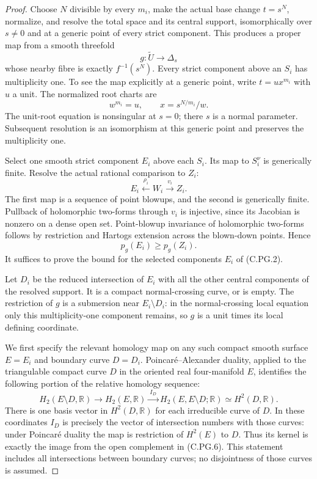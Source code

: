 \begin{proof}
Choose $N$ divisible by every $m_i$, make the actual
base change $t=s^N$, normalize, and resolve the total
space and its central support, isomorphically over
$s\ne0$ and at a generic point of every strict
component. This produces a proper map from a smooth
threefold
\[
                         g:\widetilde U\to\Delta_s
                                                               \tag{C.PG.2}
\]
whose nearby fibre is exactly $f^{-1}(s^N)$.
Every strict component above an $S_i$ has multiplicity
one. To see the map explicitly at a generic point,
write $t=u x^{m_i}$ with $u$ a unit. The normalized
root charts are
\[
       w^{m_i}=u,\qquad x=s^{N/m_i}/w.
                                                               \tag{C.PG.3}
\]
The unit-root equation is nonsingular at $s=0$;
there $s$ is a normal parameter. Subsequent
resolution is an isomorphism at this generic
point and preserves the multiplicity one.

Select one smooth strict component $E_i$ above each
$S_i$. Its map to $S_i^\nu$ is generically finite.
Resolve the actual rational comparison to $Z_i$:
\[
              E_i\xleftarrow{\rho_i}W_i
                            \xrightarrow{v_i}Z_i.
                                                               \tag{C.PG.4}
\]
The first map is a sequence of point blowups,
and the second is generically finite. Pullback
of holomorphic two-forms through $v_i$ is
injective, since its Jacobian is nonzero on
a dense open set. Point-blowup invariance of
holomorphic two-forms follows by restriction
and Hartogs extension across the blown-down
points. Hence
\[
                         p_g(E_i)\ge p_g(Z_i).
                                                               \tag{C.PG.5}
\]
It suffices to prove the bound for the selected
components $E_i$ of (C.PG.2).

Let $D_i$ be the reduced intersection of $E_i$
with all the other central components of the
resolved support. It is a compact normal-crossing
curve, or is empty. The restriction of $g$ is
a submersion near $E_i\setminus D_i$: in the
normal-crossing local equation only this
multiplicity-one component remains, so $g$
is a unit times its local defining coordinate.

We first specify the relevant homology map on
any such compact smooth surface $E=E_i$ and
boundary curve $D=D_i$. Poincar\'e--Alexander
duality, applied to the triangulable compact
curve $D$ in the oriented real four-manifold
$E$, identifies the following portion of the
relative homology sequence:
\[
 H_2(E\setminus D,\mathbb R)\longrightarrow
 H_2(E,\mathbb R)\xrightarrow{\ I_D\ }
 H_2(E,E\setminus D;\mathbb R)
       \simeq H^2(D,\mathbb R).
                                                               \tag{C.PG.6}
\]
There is one basis vector in $H^2(D,\mathbb R)$
for each irreducible curve of $D$. In these
coordinates $I_D$ is precisely the vector of
intersection numbers with those curves: under
Poincar\'e duality the map is restriction of
$H^2(E)$ to $D$. Thus its kernel is exactly
the image from the open complement in
(C.PG.6). This statement includes all
intersections between boundary curves; no
disjointness of those curves is assumed.


\end{proof}
